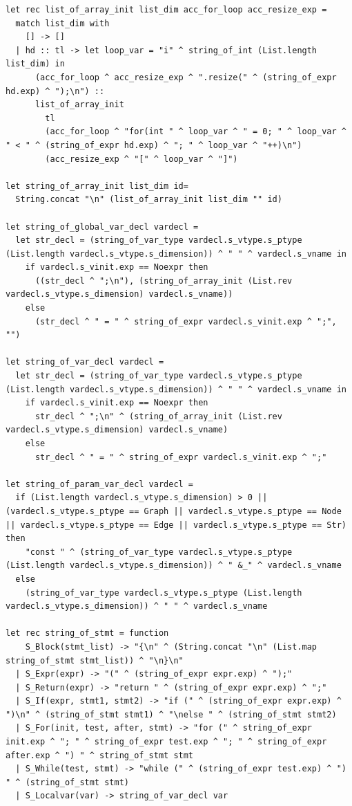 \documentclass[a4paper,12pt]{article}
\begin{document}
\begin{lstlisting}
let rec list_of_array_init list_dim acc_for_loop acc_resize_exp =
  match list_dim with
    [] -> []
  | hd :: tl -> let loop_var = "i" ^ string_of_int (List.length list_dim) in
      (acc_for_loop ^ acc_resize_exp ^ ".resize(" ^ (string_of_expr hd.exp) ^ ");\n") ::
      list_of_array_init
        tl
        (acc_for_loop ^ "for(int " ^ loop_var ^ " = 0; " ^ loop_var ^ " < " ^ (string_of_expr hd.exp) ^ "; " ^ loop_var ^ "++)\n")
        (acc_resize_exp ^ "[" ^ loop_var ^ "]")

let string_of_array_init list_dim id=
  String.concat "\n" (list_of_array_init list_dim "" id)

let string_of_global_var_decl vardecl =
  let str_decl = (string_of_var_type vardecl.s_vtype.s_ptype (List.length vardecl.s_vtype.s_dimension)) ^ " " ^ vardecl.s_vname in
    if vardecl.s_vinit.exp == Noexpr then
      ((str_decl ^ ";\n"), (string_of_array_init (List.rev vardecl.s_vtype.s_dimension) vardecl.s_vname))
    else
      (str_decl ^ " = " ^ string_of_expr vardecl.s_vinit.exp ^ ";", "")

let string_of_var_decl vardecl =
  let str_decl = (string_of_var_type vardecl.s_vtype.s_ptype (List.length vardecl.s_vtype.s_dimension)) ^ " " ^ vardecl.s_vname in
    if vardecl.s_vinit.exp == Noexpr then
      str_decl ^ ";\n" ^ (string_of_array_init (List.rev vardecl.s_vtype.s_dimension) vardecl.s_vname)
    else
      str_decl ^ " = " ^ string_of_expr vardecl.s_vinit.exp ^ ";"

let string_of_param_var_decl vardecl =
  if (List.length vardecl.s_vtype.s_dimension) > 0 || (vardecl.s_vtype.s_ptype == Graph || vardecl.s_vtype.s_ptype == Node || vardecl.s_vtype.s_ptype == Edge || vardecl.s_vtype.s_ptype == Str) then
    "const " ^ (string_of_var_type vardecl.s_vtype.s_ptype (List.length vardecl.s_vtype.s_dimension)) ^ " &_" ^ vardecl.s_vname
  else 
    (string_of_var_type vardecl.s_vtype.s_ptype (List.length vardecl.s_vtype.s_dimension)) ^ " " ^ vardecl.s_vname

let rec string_of_stmt = function
    S_Block(stmt_list) -> "{\n" ^ (String.concat "\n" (List.map string_of_stmt stmt_list)) ^ "\n}\n"
  | S_Expr(expr) -> "(" ^ (string_of_expr expr.exp) ^ ");"
  | S_Return(expr) -> "return " ^ (string_of_expr expr.exp) ^ ";"
  | S_If(expr, stmt1, stmt2) -> "if (" ^ (string_of_expr expr.exp) ^ ")\n" ^ (string_of_stmt stmt1) ^ "\nelse " ^ (string_of_stmt stmt2)
  | S_For(init, test, after, stmt) -> "for (" ^ string_of_expr init.exp ^ "; " ^ string_of_expr test.exp ^ "; " ^ string_of_expr after.exp ^ ") " ^ string_of_stmt stmt
  | S_While(test, stmt) -> "while (" ^ (string_of_expr test.exp) ^ ") " ^ (string_of_stmt stmt)
  | S_Localvar(var) -> string_of_var_decl var


\end{lstlisting}
\end{document}
